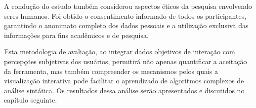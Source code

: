 A condução do estudo também considerou aspectos éticos da pesquisa envolvendo seres humanos. Foi obtido o consentimento informado de todos os participantes, garantindo o anonimato completo dos dados pessoais e a utilização exclusiva das informações para fins acadêmicos e de pesquisa.

Esta metodologia de avaliação, ao integrar dados objetivos de interação com percepções subjetivas dos usuários, permitirá não apenas quantificar a aceitação da ferramenta, mas também compreender os mecanismos pelos quais a visualização interativa pode facilitar o aprendizado de algoritmos complexos de análise sintática. Os resultados dessa análise serão apresentados e discutidos no capítulo seguinte.